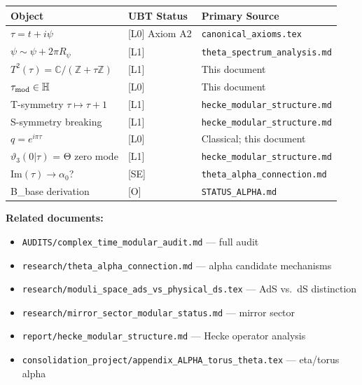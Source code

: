 \documentclass[11pt,a4paper]{article}
\begin{document}
\begin{center}
\begin{tabular}{|l|l|l|}
\hline
\textbf{Object} & \textbf{UBT Status} & \textbf{Primary Source} \\
\hline
$\tau = t + i\psi$ & [L0] Axiom A2 & \texttt{canonical\_axioms.tex} \\
$\psi \sim \psi + 2\pi R_\psi$ & [L1] & \texttt{theta\_spectrum\_analysis.md} \\
$T^2(\tau) = \mathbb{C}/(\mathbb{Z}+\tau\mathbb{Z})$ & [L1] & This document \\
$\tau_{\rm mod} \in \mathbb{H}$ & [L0] & This document \\
T-symmetry $\tau \mapsto \tau+1$ & [L1] & \texttt{hecke\_modular\_structure.md} \\
S-symmetry breaking & [L1] & \texttt{hecke\_modular\_structure.md} \\
$q = e^{i\pi\tau}$ & [L0] & Classical; this document \\
$\vartheta_3(0|\tau)$ = Θ zero mode & [L1] & \texttt{hecke\_modular\_structure.md} \\
$\mathrm{Im}(\tau) \to \alpha_0$? & [SE] & \texttt{theta\_alpha\_connection.md} \\
B\_base derivation & [O] & \texttt{STATUS\_ALPHA.md} \\
\hline
\end{tabular}
\end{center}

\bigskip

\noindent\textbf{Related documents:}
\begin{itemize}
  \item \texttt{AUDITS/complex\_time\_modular\_audit.md} — full audit
  \item \texttt{research/theta\_alpha\_connection.md} — alpha candidate mechanisms
  \item \texttt{research/moduli\_space\_ads\_vs\_physical\_ds.tex} — AdS vs.\ dS distinction
  \item \texttt{research/mirror\_sector\_modular\_status.md} — mirror sector
  \item \texttt{report/hecke\_modular\_structure.md} — Hecke operator analysis
  \item \texttt{consolidation\_project/appendix\_ALPHA\_torus\_theta.tex} — eta/torus alpha
\end{itemize}
\end{document}
